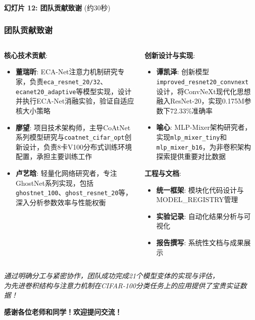 \documentclass[10pt]{beamer}
\begin{document}
\begin{frame}{\textbf{幻灯片 12: 团队贡献致谢} (约30秒)}
\frametitle{团队贡献致谢}

\begin{columns}[T]
    \begin{column}{0.48\textwidth}
        \textbf{核心技术贡献}:
        \begin{itemize}
            \item \textbf{董瑞昕}: ECA-Net注意力机制研究专家，负责\texttt{eca\_resnet\_20/32}、\texttt{ecanet20\_adaptive}等模型实现，设计并执行ECA-Net消融实验，验证自适应核大小策略
            \item \textbf{廖望}: 项目技术架构师，主导CoAtNet系列模型研究与\texttt{coatnet\_cifar\_opt}创新设计，负责8卡V100分布式训练环境配置，承担主要训练工作
            \item \textbf{卢艺晗}: 轻量化网络研究者，专注GhostNet系列实现，包括\texttt{ghostnet\_100}、\texttt{ghost\_resnet\_20}等，深入分析参数效率与性能权衡
        \end{itemize}
    \end{column}
    \begin{column}{0.48\textwidth}
        \textbf{创新设计与实现}:
        \begin{itemize}
            \item \textbf{谭凯泽}: 创新模型\texttt{improved\_resnet20\_convnext}设计，将ConvNeXt现代化思想融入ResNet-20，实现0.175M参数下72.33\%准确率
            \item \textbf{喻心}: MLP-Mixer架构研究者，实现\texttt{mlp\_mixer\_tiny}和\texttt{mlp\_mixer\_b16}，为非卷积架构探索提供重要对比数据
        \end{itemize}
        
        \vspace{0.5em}
        \textbf{工程与文档}:
        \begin{itemize}
            \item \textbf{统一框架}: 模块化代码设计与MODEL\_REGISTRY管理
            \item \textbf{实验记录}: 自动化结果分析与可视化
            \item \textbf{报告撰写}: 系统性文档与成果展示
        \end{itemize}
    \end{column}
\end{columns}

\vspace{0.8em}
\centering
\textit{通过明确分工与紧密协作，团队成功完成21个模型变体的实现与评估，\\
为先进卷积结构与注意力机制在CIFAR-100分类任务上的应用提供了宝贵实证数据！}

\vspace{0.5em}
\centering
\textbf{感谢各位老师和同学！欢迎提问交流！}

\end{frame}
\end{document}
